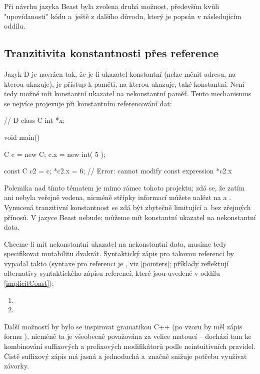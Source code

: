 Při návrhu jazyka Beast byla zvolena druhá možnost, především kvůli "upovídanosti" kódu a~ještě z dalšího důvodu, který je popsán v následujícím oddílu.

\subsection{Tranzitivita konstantnosti přes reference} \label{constPropagation} Jazyk D je navržen tak, že je-li ukazatel konstantní (nelze měnit adresu, na kterou ukazuje), je přístup k paměti, na kterou ukazuje, také konstantní. Není tedy možné mít konstantní ukazatel na nekonstantní paměť. Tento mechanismus se nejvíce projevuje při konstantním referencování dat:
\begin{dcode}
// D
class C {
	int *x;
}

void main() {
	C c = new C;
	c.x = new int( 5 );
	
	const C c2 = c;
	*c2.x = 6; // Error: cannot modify const expression *c2.x
}
\end{dcode}

Polemika nad tímto tématem je mimo rámec tohoto projektu; zdá se, že zatím ani nebyla veřejně vedena, nicméně střípky informací můžete nalézt na \cite{FullyTransitiveConst} a \cite{TransitiveConst2}. Vynucená tranzitivní konstantnost se zdá být zbytečně limitující a~bez zřejmých přínosů. V jazyce Beast nebude; můžeme mít konstantní ukazatel na nekonstantní data.

Chceme-li mít nekonstantní ukazatel na nekonstantní data, musíme tedy specifikovat mutabilitu dvakrát. Syntaktický zápis pro takovou referenci by vypadal takto (syntaxe pro referenci je , viz \autoref{pointers}; příklady reflektují alternativy syntaktického zápisu referencí, které jsou uvedené v oddílu \ref{implicitConst}):
\begin{enumerate}
	\item {}
	\item {}
\end{enumerate}

Další možností by bylo se inspirovat gramatikou C++ (po vzoru  by měl zápis formu ), nicméně ta je všeobecně považována za velice matoucí -- dochází tam ke kombinování suffixových a prefixových modifikátorů podle neintuitivních pravidel. Čistě suffixový zápis má jasná a jednoduchá a~značně snižuje potřebu využívat závorky.

